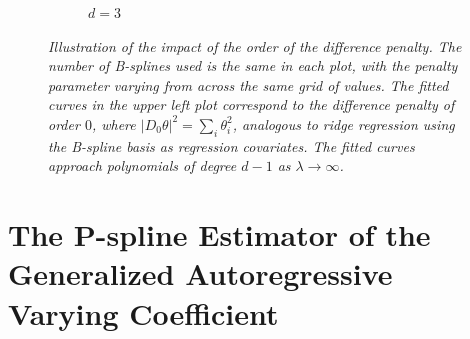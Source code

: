 \begin{figure}[H]
\begin{subfigure}{.5\textwidth}
\caption{$d=3$}
\end{subfigure}
\caption{\textit{Illustration of the impact of the order of the difference penalty. The number of B-splines used is the same in each plot, with the penalty parameter varying from across the same grid of values. The fitted curves in the upper left plot correspond to the difference penalty of order $0$, where $\vert D_0 \theta \vert^2 = \sum_{i} \theta_i^2$, analogous to ridge regression using the B-spline basis as regression covariates. The fitted curves approach polynomials of degree $d-1$ as $\lambda \rightarrow \infty$.}} \label{fig:PS-difference-order-demo}
\end{figure}



\section{The P-spline Estimator of the Generalized Autoregressive Varying Coefficient}

